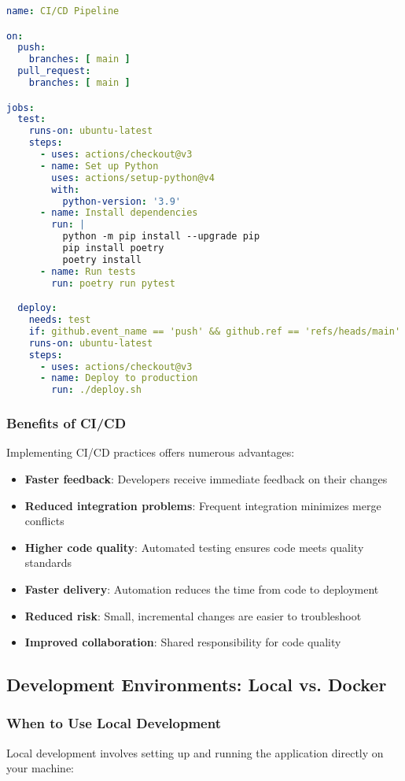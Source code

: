 \begin{lstlisting}[language=yaml, caption=Example GitHub Actions CI/CD Pipeline]
name: CI/CD Pipeline

on:
  push:
    branches: [ main ]
  pull_request:
    branches: [ main ]

jobs:
  test:
    runs-on: ubuntu-latest
    steps:
      - uses: actions/checkout@v3
      - name: Set up Python
        uses: actions/setup-python@v4
        with:
          python-version: '3.9'
      - name: Install dependencies
        run: |
          python -m pip install --upgrade pip
          pip install poetry
          poetry install
      - name: Run tests
        run: poetry run pytest

  deploy:
    needs: test
    if: github.event_name == 'push' && github.ref == 'refs/heads/main'
    runs-on: ubuntu-latest
    steps:
      - uses: actions/checkout@v3
      - name: Deploy to production
        run: ./deploy.sh
\end{lstlisting}

\subsubsection{Benefits of CI/CD}
Implementing CI/CD practices offers numerous advantages:

\begin{itemize}
    \item \textbf{Faster feedback}: Developers receive immediate feedback on their changes
    \item \textbf{Reduced integration problems}: Frequent integration minimizes merge conflicts
    \item \textbf{Higher code quality}: Automated testing ensures code meets quality standards
    \item \textbf{Faster delivery}: Automation reduces the time from code to deployment
    \item \textbf{Reduced risk}: Small, incremental changes are easier to troubleshoot
    \item \textbf{Improved collaboration}: Shared responsibility for code quality
\end{itemize}

\subsection{Development Environments: Local vs. Docker}

\subsubsection{When to Use Local Development}
Local development involves setting up and running the application directly on your machine:

